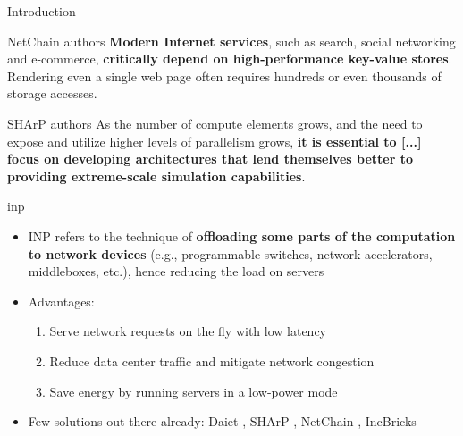 \begin{frame}[fragile]{Introduction}

    \vspace{5mm}

    \begin{aquote}{NetChain \cite{netchain} authors}
        \textbf{Modern Internet services}, such as search, social networking and e-commerce, \textbf{critically depend on high-performance key-value stores}. Rendering even a single web page often requires hundreds or even thousands of storage accesses.
    \end{aquote}

    \vspace{7mm}

    \begin{aquote}{SHArP \cite{sharp} authors}
        As the number of compute elements grows, and the need to expose and utilize higher levels of parallelism grows, \textbf{it is essential to [...] focus on developing architectures that lend themselves better to providing extreme-scale simulation capabilities}.
    \end{aquote}
\end{frame}

\begin{frame}[fragile]{\gls{inp}}
    \begin{itemize}
        \item INP refers to the technique of \textbf{offloading some parts of the computation to network devices} (e.g., programmable switches, network accelerators, middleboxes, etc.), hence reducing the load on servers
        \item Advantages:
        \begin{enumerate} %
            \item Serve network requests on the fly with low latency
            \item Reduce data center traffic and mitigate network congestion
            \item Save energy by running servers in a low-power mode
        \end{enumerate}
        \item Few solutions out there already: Daiet \cite{daiet}, SHArP \cite{sharp}, NetChain \cite{netchain}, IncBricks \cite{incbricks}
    \end{itemize}
\end{frame}

